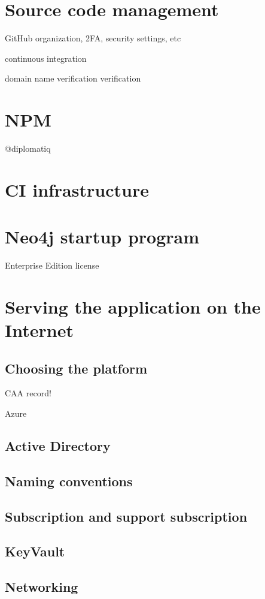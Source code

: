 \section{Source code management}

GitHub organization, 2FA, security settings, etc

continuous integration

domain name verification verification

\section{NPM}

@diplomatiq

\section{CI infrastructure}

\section{Neo4j startup program}
Enterprise Edition license

\section{Serving the application on the Internet}

\subsection{Choosing the platform}

CAA record!

Azure
\subsection{Active Directory}
\subsection{Naming conventions}
\subsection{Subscription and support subscription}
\subsection{KeyVault}
\subsection{Networking}
